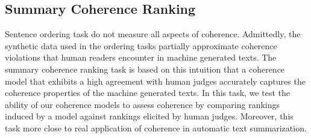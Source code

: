 \subsection{Summary Coherence Ranking}
%
Sentence ordering task do not measure all aspects of coherence. 
Admittedly, the synthetic data used in the ordering tasks partially approximate coherence violations that human readers encounter in machine generated texts. 
The summary coherence ranking task is based on this intuition that a coherence model that exhibits a high agreement with human judges accurately captures the coherence properties of the machine generated texts. 
In this task, we test the ability of our coherence models to assess coherence by comparing rankings induced by a model against rankings elicited by human judges. 
Moreover, this task more close to real application of coherence in automatic text summarization.

